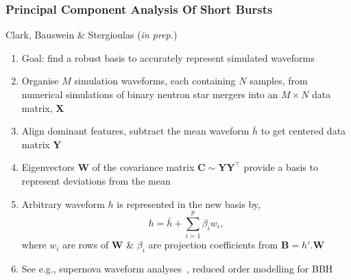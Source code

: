 \documentclass[serif,mathserif,10pt]{beamer}
\let\oldframetitle\frametitle%
\renewcommand{\frametitle}[1]{%
      \oldframetitle{#1}\setstretch{1.2}}
\newcommand{\matr}[1]{\mathbf{#1}}
\newcommand{\tran}[1]{#1^{\top}}
\begin{document}
\begin{frame}
    \frametitle{Principal Component Analysis Of Short Bursts}
    Clark, Bauswein \& Stergioulas (\emph{in prep.})
    \begin{small}
    \begin{enumerate}
        \item Goal: find a robust basis to accurately represent simulated
            waveforms
        \item Organise $M$ simulation waveforms, each containing $N$ samples,
            from numerical simulations of binary neutron star mergers into an
            $M\times N$ data matrix, $\matr{X}$
        \item Align dominant features, subtract the
            mean waveform $\bar{h}$ to get centered data matrix $\matr{Y}$
        \item Eigenvectors $\matr{W}$ of the covariance matrix
            $\matr{C} \sim \matr{Y}\tran{\matr{Y}}$ provide a basis to represent
            deviations from the mean
        \item Arbitrary waveform $h$ is represented in the new basis by,
            \begin{equation}
                h = \bar{h} + \sum_{i=1}^p \beta_i w_i,
            \end{equation}
            where $w_i$ are rows of $\matr{W}$ \& $\beta_i$ are projection
            coefficients from $\matr{B}=h'.\matr{W}$ 
        \item See e.g., supernova waveform analyses~\cite{2012PhRvD..86d4023L},
            reduced order modelling for BBH~\cite{2014CQGra..31s5010P}
    \end{enumerate}
\end{small}
\end{frame}
\end{document}
